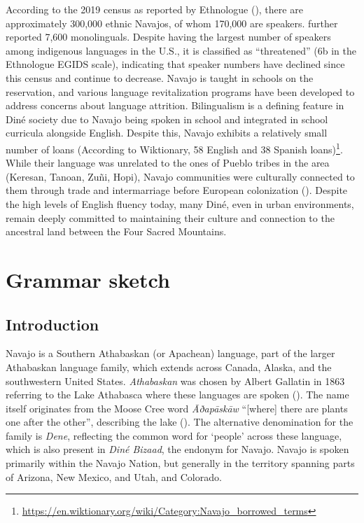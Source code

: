 According to the 2019 census as reported by Ethnologue (\cite{ethnologue2021}), there are approximately 300,000 ethnic Navajos, of whom 170,000 are speakers. \citet{Denetclaw:2017sd} further reported 7,600 monolinguals. Despite having the largest number of speakers among indigenous languages in the U.S., it is classified as ``threatened'' (6b in the Ethnologue EGIDS scale), indicating that speaker numbers have declined since this census and continue to decrease. Navajo is taught in schools on the reservation, and various language revitalization programs have been developed to address concerns about language attrition. Bilingualism is a defining feature in Diné society due to Navajo being spoken in school and integrated in school curricula alongside English. Despite this, Navajo exhibits a relatively small number of loans (According to Wiktionary, 58 English and 38 Spanish loans)\footnote{\url{https://en.wiktionary.org/wiki/Category:Navajo_borrowed_terms}}. While their language was unrelated to the ones of Pueblo tribes in the area (Keresan, Tanoan, Zuñi, Hopi), Navajo communities were culturally connected to them through trade and intermarriage before European colonization (\cite{Warburton:2005le}). Despite the high levels of English fluency today, many Diné, even in urban environments, remain deeply committed to maintaining their culture and connection to the ancestral land between the Four Sacred Mountains.

\section{Grammar sketch} 

\subsection{Introduction}

Navajo is a Southern Athabaskan (or Apachean) language, part of the larger Athabaskan language family, which extends across Canada, Alaska, and the southwestern United States. \textit{Athabaskan} was chosen by Albert Gallatin in 1863 referring to the Lake Athabasca where these languages are spoken (\cite[17]{Gallatin:1836ph}). The name itself originates from the Moose Cree word \textit{Āðapāskāw} ``[where] there are plants one after the other'', describing the lake (\cite[52]{Bright:2004kl}). The alternative denomination for the family is \textit{Dene}, reflecting the common word for `people' across these language, which is also present in \textit{Diné Bizaad}, the endonym for Navajo. Navajo is spoken primarily within the Navajo Nation, but generally in the territory spanning parts of Arizona, New Mexico, and Utah, and Colorado.

